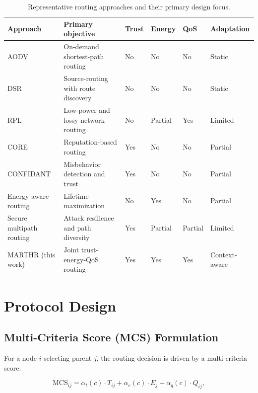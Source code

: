 \documentclass[conference]{IEEEtran}
\begin{document}
\begin{table}[t]
\centering
\caption{Representative routing approaches and their primary design focus.}
\label{tab:related}
\begin{tabular}{p{2.3cm}p{3.7cm}p{0.9cm}p{0.9cm}p{0.9cm}p{2.0cm}}
\toprule
Approach & Primary objective & Trust & Energy & QoS & Adaptation \\
\midrule
AODV \cite{perkins2003adhoc} & On-demand shortest-path routing & No & No & No & Static \\
DSR \cite{johnson2001dynamic} & Source-routing with route discovery & No & No & No & Static \\
RPL \cite{winter2012rpl} & Low-power and lossy network routing & No & Partial & Yes & Limited \\
CORE \cite{michiardi2002core} & Reputation-based routing & Yes & No & No & Partial \\
CONFIDANT \cite{buchegger2002confidant} & Misbehavior detection and trust & Yes & No & No & Partial \\
Energy-aware routing \cite{singh1998power,he2014energy} & Lifetime maximization & No & Yes & No & Partial \\
Secure multipath routing \cite{nasser2007secure} & Attack resilience and path diversity & Yes & Partial & Partial & Limited \\
MARTHR (this work) & Joint trust-energy-QoS routing & Yes & Yes & Yes & Context-aware \\
\bottomrule
\end{tabular}
\end{table}

\section{Protocol Design}

\subsection{Multi-Criteria Score (MCS) Formulation}

For a node $i$ selecting parent $j$, the routing decision is driven by a multi-criteria score:

\begin{equation}
\text{MCS}_{ij} = \alpha_t(c) \cdot T_{ij} + \alpha_e(c) \cdot E_j + \alpha_q(c) \cdot Q_{ij},
\label{eq:mcs}
\end{equation}
\end{document}
